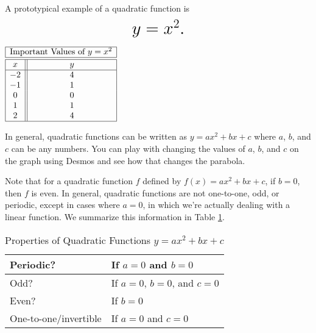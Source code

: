 \documentclass[nooutcomes]{ximera}
\begin{document}
\begin{example}
A prototypical example of a quadratic function is $$ \mbox{\huge $y=x^2.$}$$

\begin{image}
\end{image}

\begin{center}
\(
\begin{array}{ |c || c|  }
 \hline
 \multicolumn{2}{|c|}{\text{\normalfont Important Values of } y=x^2} \\
\hline
 \hline
 x & y\\
 \hline
 -2&4\\
 -1&1\\
 0&0\\
 1&1\\
 2&4\\
 \hline
\end{array}
\)
\end{center}
\end{example}

In general, quadratic functions can be written as $y=ax^2+bx+c$ where $a$, $b$, and $c$ can be any numbers.  You can play with changing the values of $a$, $b$, and $c$ on the graph using Desmos and see how that changes the parabola.  

\begin{center}  
\end{center}

Note that for a quadratic function $f$ defined by $f(x) = ax^2 + bx + c$, if $b = 0$, then $f$ is even. In general, quadratic functions are not one-to-one, odd, or periodic, except in cases where $a = 0$, in which we're actually dealing with a linear function. We summarize this information in Table \ref{tab:quadraticproperties}.

\begin{table}[h]
\caption{\label{tab:quadraticproperties}Properties of Quadratic Functions $y = ax^2 + bx + c$}
\centering
\begin{tabular}{l|l}
Periodic? & If $a = 0$ and $b = 0$ \\ \hline
Odd? &  If $a = 0$, $b = 0$, and $c = 0$ \\ \hline
Even? & If $b = 0$ \\ \hline
One-to-one/invertible & If $a = 0$ and $c = 0$ 
\end{tabular}
\end{table}
\end{document}
